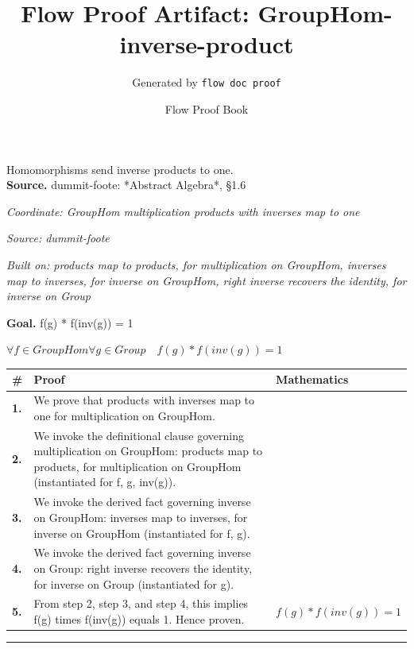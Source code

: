 \documentclass[11pt]{article}
\title{Flow Proof Artifact: GroupHom-inverse-product}
\author{Generated by \texttt{flow doc proof}}
\date{Flow Proof Book}
\theoremstyle{definition}
\begin{document}
\maketitle
Homomorphisms send inverse products to one.\\[0.5em]
\textbf{Source.} dummit-foote: *Abstract Algebra*, §1.6\\[0.5em]
\bigskip
{}\par
\smallskip\noindent\textit{Coordinate: GroupHom \cdot multiplication \cdot products with inverses map to one}\par
\smallskip\noindent\textit{Source: dummit-foote}\par
\smallskip\noindent\textit{Built on: products map to products, for multiplication on GroupHom, inverses map to inverses, for inverse on GroupHom, right inverse recovers the identity, for inverse on Group}\par
\medskip
\noindent\textbf{Goal.} f(g) * f(inv(g)) = 1\par
\noindent$\displaystyle \forall f \in GroupHom \forall g \in Group\quad f(g) * f(inv(g)) = 1$\par
\medskip
\noindent
\begin{tabular}{@{} >{\raggedright\arraybackslash}p{} >{\raggedright\arraybackslash}p{} >{\raggedleft\arraybackslash}p{} @{}}
\textbf{\#} & \textbf{Proof} & \textbf{Mathematics} \\
\midrule
\textbf{1.} & We prove that products with inverses map to one for multiplication on GroupHom. & \\[0.45em]
\textbf{2.} & We invoke the definitional clause governing multiplication on GroupHom: products map to products, for multiplication on GroupHom (instantiated for f, g, inv(g)). & \\[0.45em]
\textbf{3.} & We invoke the derived fact governing inverse on GroupHom: inverses map to inverses, for inverse on GroupHom (instantiated for f, g). & \\[0.45em]
\textbf{4.} & We invoke the derived fact governing inverse on Group: right inverse recovers the identity, for inverse on Group (instantiated for g). & \\[0.45em]
\textbf{5.} & From step 2, step 3, and step 4, this implies f(g) times f(inv(g)) equals 1. Hence proven. & $\displaystyle f(g) * f(inv(g)) = 1$ \\[0.45em]
\bottomrule
\end{tabular}
\label{thm:GroupHom-multiplication-products_with_inverses_map_to_one}
\par\medskip\hrule
\end{document}
